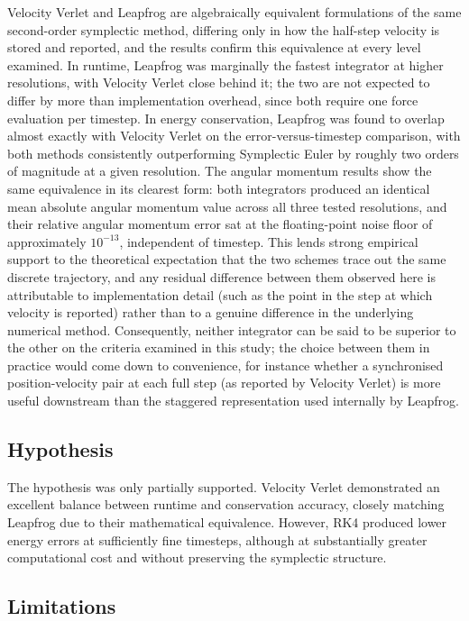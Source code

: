 Velocity Verlet and Leapfrog are algebraically equivalent formulations of the same second-order symplectic
method, differing only in how the half-step velocity is stored and reported, and the results confirm this
equivalence at every level examined. In runtime, Leapfrog was marginally the fastest integrator at higher
resolutions, with Velocity Verlet close behind it; the two are not expected to differ by more than
implementation overhead, since both require one force evaluation per timestep. In energy conservation,
Leapfrog was found to overlap almost exactly with Velocity Verlet on the error-versus-timestep comparison,
with both methods consistently outperforming Symplectic Euler by roughly two orders of magnitude at a given
resolution. The angular momentum results show the same equivalence in its clearest form: both integrators
produced an identical mean absolute angular momentum value across all three tested resolutions, and their
relative angular momentum error sat at the floating-point noise floor of approximately $10^{-13}$,
independent of timestep. This lends strong empirical support to the theoretical expectation that the two
schemes trace out the same discrete trajectory, and any residual difference between them observed here is
attributable to implementation detail (such as the point in the step at which velocity is reported) rather
than to a genuine difference in the underlying numerical method. Consequently, neither integrator can be
said to be superior to the other on the criteria examined in this study; the choice between them in practice
would come down to convenience, for instance whether a synchronised position-velocity pair at each full step
(as reported by Velocity Verlet) is more useful downstream than the staggered representation used internally
by Leapfrog.

\subsection{Hypothesis}

The hypothesis was only partially supported. Velocity Verlet demonstrated an excellent balance between runtime
and conservation accuracy, closely matching Leapfrog due to their mathematical equivalence.
However, RK4 produced lower energy errors at sufficiently fine timesteps, although at substantially greater
computational cost and without preserving the symplectic structure.

\subsection{Limitations}

